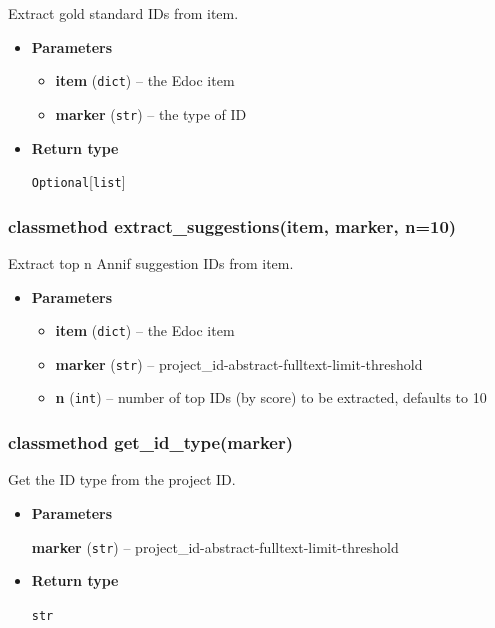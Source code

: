 Extract gold standard IDs from item.

\begin{itemize}
\item
  \textbf{Parameters}

  \begin{itemize}
  \item
    \textbf{item} (\texttt{dict}) -- the Edoc item
  \item
    \textbf{marker} (\texttt{str}) -- the type of ID
  \end{itemize}
\item
  \textbf{Return type}

  \texttt{Optional}{[}\texttt{list}{]}
\end{itemize}

\hypertarget{classmethod-extract_suggestionsitem-marker-n10}{%
\subsubsection{classmethod extract\_suggestions(item, marker,
n=10)}\label{classmethod-extract_suggestionsitem-marker-n10}}

Extract top n Annif suggestion IDs from item.

\begin{itemize}
\item
  \textbf{Parameters}

  \begin{itemize}
  \item
    \textbf{item} (\texttt{dict}) -- the Edoc item
  \item
    \textbf{marker} (\texttt{str}) --
    project\_id-abstract-fulltext-limit-threshold
  \item
    \textbf{n} (\texttt{int}) -- number of top IDs (by score) to be
    extracted, defaults to 10
  \end{itemize}
\end{itemize}

\hypertarget{classmethod-get_id_typemarker}{%
\subsubsection{classmethod
get\_id\_type(marker)}\label{classmethod-get_id_typemarker}}

Get the ID type from the project ID.

\begin{itemize}
\item
  \textbf{Parameters}

  \textbf{marker} (\texttt{str}) --
  project\_id-abstract-fulltext-limit-threshold
\item
  \textbf{Return type}

  \texttt{str}
\end{itemize}

